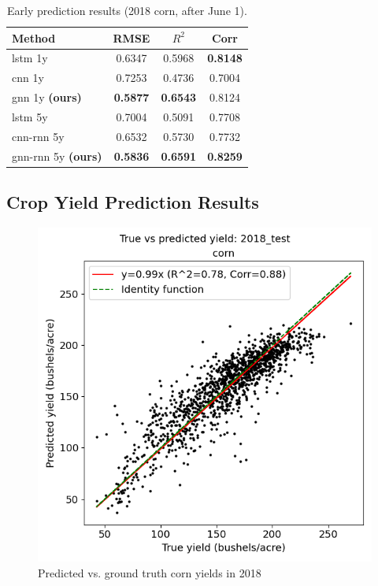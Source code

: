 \begin{table}[t]
\centering
\begin{tabular}{|l|c|c|c|} \hline
\textbf{Method} & \textbf{RMSE} & \textbf{$R^2$} & \textbf{Corr} \\ \hline
lstm 1y & 0.6347 & 0.5968 & \textbf{0.8148} \\
cnn 1y & 0.7253	& 0.4736 & 0.7004 \\
gnn 1y \textbf{(ours)} & \textbf{0.5877} & \textbf{0.6543} & 0.8124 \\ \hline
lstm 5y & 0.7004 & 0.5091 & 0.7708 \\
cnn-rnn 5y & 0.6532 & 0.5730 & 0.7732 \\
gnn-rnn 5y \textbf{(ours)} & \textbf{0.5836} & \textbf{0.6591} & \textbf{0.8259} \\ \hline
\end{tabular}
\caption{Early prediction results (2018 corn, after June 1).}
\label{early}
\end{table}

\subsection{Crop Yield Prediction Results}


\begin{figure}[bt]
\centering
\includegraphics[width=0.8\columnwidth]{figs/true_vs_predicted_scatter_corn_2018_test.png}
\caption{Predicted vs. ground truth corn yields in 2018}
\label{scatter}
\end{figure}


